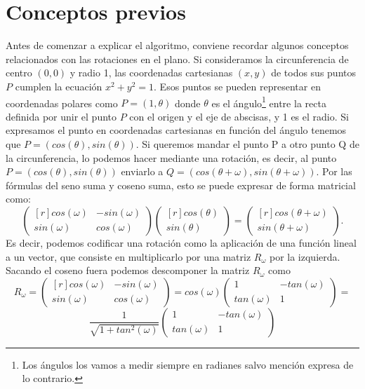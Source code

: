 \documentclass[12pt, a4paper]{article}
\begin{document}
\section{Conceptos previos}
Antes de comenzar a explicar el algoritmo, conviene recordar algunos conceptos relacionados con las rotaciones en el plano. Si consideramos la circunferencia de centro $(0,0)$ y radio 1, las coordenadas cartesianas $(x,y)$ de todos sus puntos $P$ cumplen la ecuación $x^2+y^2=1$. Esos puntos se pueden representar en coordenadas polares como $P=(1,\theta)$  donde $\theta$ es el ángulo\footnote{Los ángulos los vamos a medir siempre en radianes salvo mención expresa de lo contrario.} entre la recta definida por unir el punto $P$ con el origen y el eje de abscisas, y 1 es el radio. Si expresamos el punto en coordenadas cartesianas en función del ángulo tenemos que $P=(cos(\theta),sin(\theta))$. Si queremos mandar el punto P a otro punto Q de la circunferencia, lo podemos hacer mediante una rotación, es decir, al punto $P=(cos(\theta),sin(\theta))$ enviarlo a $Q=(cos(\theta+\omega),sin(\theta+\omega))$. Por las fórmulas del seno suma y coseno suma, esto se puede expresar de forma matricial como:
\[
\begin{pmatrix*}[r]
  cos(\omega) & -sin(\omega)\\
  sin(\omega) & cos(\omega) 
 \end{pmatrix*}
\begin{pmatrix*}[r]
  cos(\theta)\\
  sin(\theta)
 \end{pmatrix*}
 =
 \begin{pmatrix*}[r]
  cos(\theta+\omega)\\
  sin(\theta+\omega)
 \end{pmatrix*}.
\]
Es decir, podemos codificar una rotación como la aplicación de una función lineal a un vector, que consiste en multiplicarlo por una matriz $R_\omega$ por la izquierda. Sacando el coseno fuera podemos descomponer la matriz $R_\omega$ como
\[
R_\omega = 
\begin{pmatrix*}[r]
  cos(\omega) & -sin(\omega)\\
  sin(\omega) & cos(\omega) 
 \end{pmatrix*}
= cos(\omega)
\begin{pmatrix*}
  1 & -tan(\omega)\\
  tan(\omega) & 1 
 \end{pmatrix*}
 =
 \]
 \[
 \frac{1}{\sqrt{1+tan^2(\omega)}}
 \begin{pmatrix*}
  1 & -tan(\omega)\\
  tan(\omega) & 1 
 \end{pmatrix*}
\]
\end{document}
